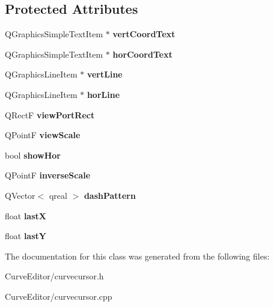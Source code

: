 \subsection*{\-Protected \-Attributes}
\begin{DoxyCompactItemize}
\item 
\hypertarget{class_curve_cursor_aa59ef98b4406b750643701409de93df1}{
\-Q\-Graphics\-Simple\-Text\-Item $\ast$ {\bfseries vert\-Coord\-Text}}
\label{class_curve_cursor_aa59ef98b4406b750643701409de93df1}

\item 
\hypertarget{class_curve_cursor_aba3a5cc86fdca574b4ac3c557cd65581}{
\-Q\-Graphics\-Simple\-Text\-Item $\ast$ {\bfseries hor\-Coord\-Text}}
\label{class_curve_cursor_aba3a5cc86fdca574b4ac3c557cd65581}

\item 
\hypertarget{class_curve_cursor_a176e03739b37f893700ca7395e716f71}{
\-Q\-Graphics\-Line\-Item $\ast$ {\bfseries vert\-Line}}
\label{class_curve_cursor_a176e03739b37f893700ca7395e716f71}

\item 
\hypertarget{class_curve_cursor_a5a348e7e978a6b44cc32ce3f567f5881}{
\-Q\-Graphics\-Line\-Item $\ast$ {\bfseries hor\-Line}}
\label{class_curve_cursor_a5a348e7e978a6b44cc32ce3f567f5881}

\item 
\hypertarget{class_curve_cursor_aaaa36df5e06f35db1a604257982f991d}{
\-Q\-Rect\-F {\bfseries view\-Port\-Rect}}
\label{class_curve_cursor_aaaa36df5e06f35db1a604257982f991d}

\item 
\hypertarget{class_curve_cursor_a0edcef02aeaceb9e18506b54e7d31b93}{
\-Q\-Point\-F {\bfseries view\-Scale}}
\label{class_curve_cursor_a0edcef02aeaceb9e18506b54e7d31b93}

\item 
\hypertarget{class_curve_cursor_a95948c4ec65953ee0c487fbe95ff713f}{
bool {\bfseries show\-Hor}}
\label{class_curve_cursor_a95948c4ec65953ee0c487fbe95ff713f}

\item 
\hypertarget{class_curve_cursor_adbc7c6528cdfa4287c013d006a1370e1}{
\-Q\-Point\-F {\bfseries inverse\-Scale}}
\label{class_curve_cursor_adbc7c6528cdfa4287c013d006a1370e1}

\item 
\hypertarget{class_curve_cursor_a245f39705eb9f5f70e4fb1b3dbaf42f5}{
\-Q\-Vector$<$ qreal $>$ {\bfseries dash\-Pattern}}
\label{class_curve_cursor_a245f39705eb9f5f70e4fb1b3dbaf42f5}

\item 
\hypertarget{class_curve_cursor_a97f66df8f384acb77a77fc6f7bed37fe}{
float {\bfseries last\-X}}
\label{class_curve_cursor_a97f66df8f384acb77a77fc6f7bed37fe}

\item 
\hypertarget{class_curve_cursor_abb838bd4c91ceab2a91cca887fecafff}{
float {\bfseries last\-Y}}
\label{class_curve_cursor_abb838bd4c91ceab2a91cca887fecafff}

\end{DoxyCompactItemize}


\-The documentation for this class was generated from the following files\-:\begin{DoxyCompactItemize}
\item 
\-Curve\-Editor/curvecursor.\-h\item 
\-Curve\-Editor/curvecursor.\-cpp\end{DoxyCompactItemize}
